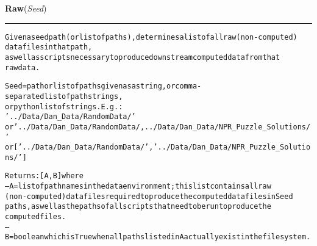 \hspace{.8\funcindent}\begin{boxedminipage}{\funcwidth}

    \raggedright \textbf{Raw}(\textit{Seed})

    \vspace{-1.5ex}

    \rule{\textwidth}{0.5\fboxrule}
\setlength{\parskip}{2ex}
\begin{alltt}

Given a seed path (or list of paths), determines a list of all raw (non-computed) 
data files in that path,
as well as scripts necessary to produce downstream computed data from that 
raw data.  

Seed = path or list of paths given as a string, or comma-separated list of path strings, 
or python list of strings.  E.g.:
                '../Data/Dan\_Data/RandomData/' 
or              '../Data/Dan\_Data/RandomData/,../Data/Dan\_Data/NPR\_Puzzle\_Solutions/'
or              ['../Data/Dan\_Data/RandomData/', '../Data/Dan\_Data/NPR\_Puzzle\_Solutions/']


Returns: [A,B] where 
--A = list of path names in the data environment; this list contains all raw 
(non-computed) data files required to produce the computed data files in Seed
paths, as well as the paths of all scripts that need to be run to produce the 
computed files.   
--B = boolean which is True when all paths listed in A actually exist in the file system. 
\end{alltt}

\setlength{\parskip}{1ex}
    \end{boxedminipage}

    \label{System:extraction:CopyOut}

    \vspace{0.5ex}


